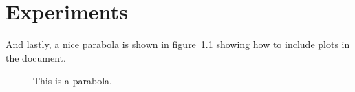 \chapter{Experiments}
\label{cha:experiments}
\Blindtext[6]
And lastly, a nice parabola is shown in figure~\ref{fig:parabola} showing how to include plots in the document.
\begin{figure}
	\centering
	
	\caption{This is a parabola.}
	\label{fig:parabola}
\end{figure}
